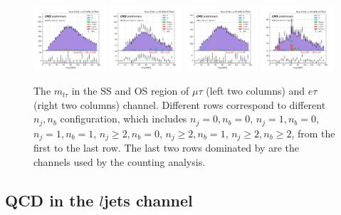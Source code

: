 \begin{figure}
    
    \includegraphics[width=0.24\textwidth]{chapters/Appendix/sectionQCD/figures/mutau_>=2_>=2_dilepton_mass.png}
    \includegraphics[width=0.24\textwidth]{chapters/Appendix/sectionQCD/figures/mutau_ss_>=2_>=2_dilepton_mass.png}
    \includegraphics[width=0.24\textwidth]{chapters/Appendix/sectionQCD/figures/etau_>=2_>=2_dilepton_mass.png}
    \includegraphics[width=0.24\textwidth]{chapters/Appendix/sectionQCD/figures/etau_ss_>=2_>=2_dilepton_mass.png}
    
    

    \caption{The $m_{l\tau}$ in the SS and OS region of $\mu\tau$ (left two columns) and $e\tau$ (right two columns) 
    channel. Different rows correspond to different $n_j,n_b$ configuration, which includes
    $n_j=0,n_b=0$, $n_j=1,n_b=0$, $n_j=1,n_b=1$, $n_j\geq 2,n_b=0$, $n_j\geq 2,n_b=1$, $n_j\geq 2,n_b\geq 2$, 
    from the first to the last row. The last two rows dominated by \ttbar are the channels used by the counting analysis.
    }
    \label{fig:appendix:qcdsf:ltau}
\end{figure}


\subsection{QCD in the $l$jets channel} 

